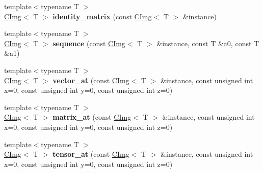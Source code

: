 \begin{DoxyCompactItemize}
\item 
\hypertarget{namespacecimg__library_ad259a7afd71d8ea61ce3e8e75628a418}{{\footnotesize template$<$typename T $>$ }\\\hyperlink{structcimg__library_1_1_c_img}{C\-Img}$<$ T $>$ {\bfseries identity\-\_\-matrix} (const \hyperlink{structcimg__library_1_1_c_img}{C\-Img}$<$ T $>$ \&instance)}\label{namespacecimg__library_ad259a7afd71d8ea61ce3e8e75628a418}

\item 
\hypertarget{namespacecimg__library_a9f87dc4ab542dc26200abfb772c87643}{{\footnotesize template$<$typename T $>$ }\\\hyperlink{structcimg__library_1_1_c_img}{C\-Img}$<$ T $>$ {\bfseries sequence} (const \hyperlink{structcimg__library_1_1_c_img}{C\-Img}$<$ T $>$ \&instance, const T \&a0, const T \&a1)}\label{namespacecimg__library_a9f87dc4ab542dc26200abfb772c87643}

\item 
\hypertarget{namespacecimg__library_a463cc91b67537c0efdfa94f5169f770f}{{\footnotesize template$<$typename T $>$ }\\\hyperlink{structcimg__library_1_1_c_img}{C\-Img}$<$ T $>$ {\bfseries vector\-\_\-at} (const \hyperlink{structcimg__library_1_1_c_img}{C\-Img}$<$ T $>$ \&instance, const unsigned int x=0, const unsigned int y=0, const unsigned int z=0)}\label{namespacecimg__library_a463cc91b67537c0efdfa94f5169f770f}

\item 
\hypertarget{namespacecimg__library_a89e463e7546504e35211be7d248f07d2}{{\footnotesize template$<$typename T $>$ }\\\hyperlink{structcimg__library_1_1_c_img}{C\-Img}$<$ T $>$ {\bfseries matrix\-\_\-at} (const \hyperlink{structcimg__library_1_1_c_img}{C\-Img}$<$ T $>$ \&instance, const unsigned int x=0, const unsigned int y=0, const unsigned int z=0)}\label{namespacecimg__library_a89e463e7546504e35211be7d248f07d2}

\item 
\hypertarget{namespacecimg__library_a19c242bca975a174401bac963f8d503d}{{\footnotesize template$<$typename T $>$ }\\\hyperlink{structcimg__library_1_1_c_img}{C\-Img}$<$ T $>$ {\bfseries tensor\-\_\-at} (const \hyperlink{structcimg__library_1_1_c_img}{C\-Img}$<$ T $>$ \&instance, const unsigned int x=0, const unsigned int y=0, const unsigned int z=0)}\label{namespacecimg__library_a19c242bca975a174401bac963f8d503d}


\end{DoxyCompactItemize}
